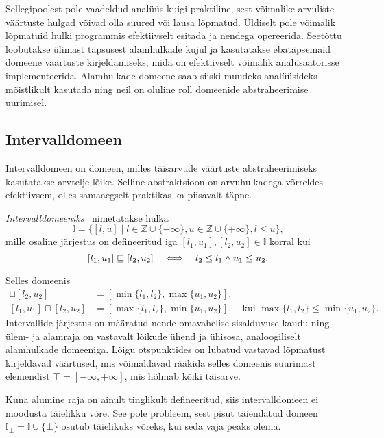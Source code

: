 \documentclass[../thesis.tex]{subfiles}
\begin{document}
Sellegipoolest pole vaadeldud analüüs kuigi praktiline, sest võimalike arvuliste väärtuste hulgad võivad olla suured või lausa lõpmatud. Üldiselt pole võimalik lõpmatuid hulki programmis efektiivselt esitada ja nendega opereerida. Seetõttu loobutakse ülimast täpsusest alamhulkade kujul ja kasutatakse ebatäpsemaid domeene väärtuste kirjeldamiseks, mida on efektiivselt võimalik analüsaatorisse implementeerida.
Alamhulkade domeene saab siiski muudeks analüüsideks mõistlikult kasutada ning neil on oluline roll domeenide abstraheerimise uurimisel.


\subsection{Intervalldomeen}
Intervalldomeen on domeen, milles täisarvude väärtuste abstraheerimiseks kasutatakse arvtelje lõike. Selline abstraktsioon on arvuhulkadega võrreldes efektiivsem, olles samaaegselt praktikas ka piisavalt täpne.

\begin{definition}
\emph{Intervalldomeeniks}~\cite[55]{seidl_foundations} nimetatakse hulka
\[
	\mathbb{I} = \{ [l, u] \mid l \in \mathbb{Z} \cup \{-\infty\}, u \in \mathbb{Z} \cup \{+\infty\}, l \leq u \},
\]
mille osaline järjestus on defineeritud iga $[l_1, u_1], [l_2, u_2] \in \mathbb{I}$ korral kui
\[
	[l_1, u_1] \sqsubseteq [l_2, u_2] \quad\Longleftrightarrow\quad l_2 \leq l_1 \land u_1 \leq u_2.
\]
\end{definition}

Selles domeenis
\begin{align*}
	[l_1, u_1] \sqcup [l_2, u_2] &= [\min\{l_1, l_2\}, \max\{u_1, u_2\}], \\
	[l_1, u_1] \sqcap [l_2, u_2] &= [\max\{l_1, l_2\}, \min\{u_1, u_2\}],\quad \text{kui } \max\{l_1, l_2\} \leq \min\{u_1, u_2\}.
\end{align*}
Intervallide järjestus on määratud nende omavahelise sisalduvuse kaudu ning ülem- ja alamraja on vastavalt lõikude ühend ja ühisosa, analoogiliselt alamhulkade domeeniga.
Lõigu otspunktides on lubatud vastavad lõpmatust kirjeldavad väärtused, mis võimaldavad rääkida selles domeenis suurimast elemendist $\top = [-\infty, +\infty]$, mis hõlmab kõiki täisarve.

Kuna alumine raja on ainult tinglikult defineeritud, siis intervalldomeen ei moodusta täielikku võre. See pole probleem, sest pisut täiendatud domeen $\mathbb{I}_\bot = \mathbb{I} \cup \{\bot\}$ osutub täielikuks võreks, kui seda vaja peaks olema.
\end{document}
